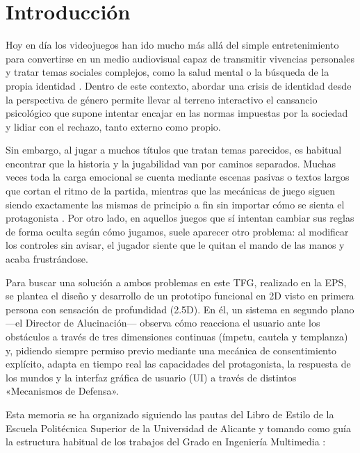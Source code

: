 \chapter{Introducción}
\label{cap:introduccion}

Hoy en día los videojuegos han ido mucho más allá del simple entretenimiento para convertirse en un medio audiovisual capaz de transmitir vivencias personales y tratar temas sociales complejos, como la salud mental o la búsqueda de la propia identidad \parencite{bogost2011, navarro2023}. Dentro de este contexto, abordar una crisis de identidad desde la perspectiva de género permite llevar al terreno interactivo el cansancio psicológico que supone intentar encajar en las normas impuestas por la sociedad y lidiar con el rechazo, tanto externo como propio.

Sin embargo, al jugar a muchos títulos que tratan temas parecidos, es habitual encontrar que la historia y la jugabilidad van por caminos separados. Muchas veces toda la carga emocional se cuenta mediante escenas pasivas o textos largos que cortan el ritmo de la partida, mientras que las mecánicas de juego siguen siendo exactamente las mismas de principio a fin sin importar cómo se sienta el protagonista \parencite{finestrat2018}. Por otro lado, en aquellos juegos que sí intentan cambiar sus reglas de forma oculta según cómo jugamos, suele aparecer otro problema: al modificar los controles sin avisar, el jugador siente que le quitan el mando de las manos y acaba frustrándose.

Para buscar una solución a ambos problemas en este \ac{TFG}, realizado en la \ac{EPS}, se plantea el diseño y desarrollo de un prototipo funcional en \ac{2D} visto en primera persona con sensación de profundidad (2.5D). En él, un sistema en segundo plano —el Director de Alucinación— observa cómo reacciona el usuario ante los obstáculos a través de tres dimensiones continuas (ímpetu, cautela y templanza) y, pidiendo siempre permiso previo mediante una mecánica de consentimiento explícito, adapta en tiempo real las capacidades del protagonista, la respuesta de los mundos y la interfaz gráfica de usuario (\ac{UI}) a través de distintos «Mecanismos de Defensa».

Esta memoria se ha organizado siguiendo las pautas del Libro de Estilo de la Escuela Politécnica Superior de la Universidad de Alicante \parencite{eps2015} y tomando como guía la estructura habitual de los trabajos del Grado en Ingeniería Multimedia \parencite{finestrat2018}:


